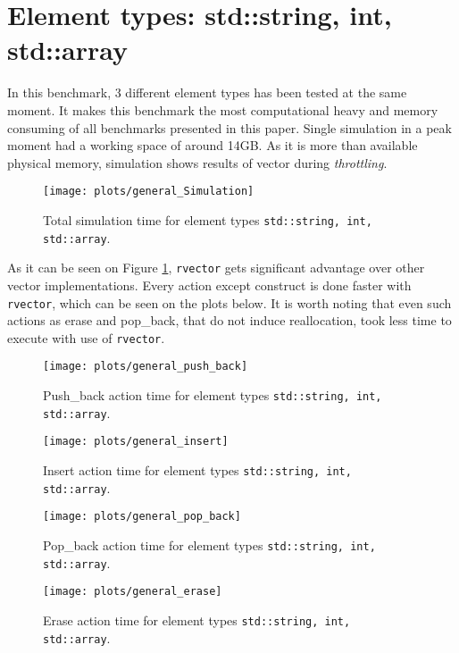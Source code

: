 \documentclass[inz, english, shortabstract]{iithesis}
\begin{document}
\clearpage
\section{Element types: std::string, int, std::array}
In this benchmark, 3 different element types has been tested at the same moment. It makes this benchmark the most computational heavy and memory consuming of all benchmarks presented in this paper. Single simulation in a peak moment had a working space of around 14GB. As it is more than available physical memory,  simulation shows results of vector during \emph{throttling}.

\begin{figure}[h!]
\texttt{[image: plots/general\_Simulation]}
\caption{Total simulation time for element types \lstinline{std::string, int, std::array}.}
\label{general_simulation}
\end{figure}

As it can be seen on Figure \ref{general_simulation}, {\tt rvector} gets significant advantage over other vector implementations. Every action except construct is done faster with {\tt rvector}, which can be seen on the plots below. It is worth noting that even such actions as erase and pop\_back, that do not induce reallocation, took less time to execute with use of {\tt rvector}. 

\begin{figure}[h!]
\texttt{[image: plots/general\_push\_back]}
\caption{Push\_back action time for element types \lstinline{std::string, int, std::array}.}
\label{general_push_back}
\end{figure}

\begin{figure}[h!]
\texttt{[image: plots/general\_insert]}
\caption{Insert action time for element types \lstinline{std::string, int, std::array}.}
\label{general_insert}
\end{figure}

\begin{figure}[h!]
\texttt{[image: plots/general\_pop\_back]}
\caption{Pop\_back action time for element types \lstinline{std::string, int, std::array}.}
\label{general_pop_back}
\end{figure}

\begin{figure}[h!]
\texttt{[image: plots/general\_erase]}
\caption{Erase action time for element types \lstinline{std::string, int, std::array}.}
\label{general_erase}
\end{figure}
\end{document}
